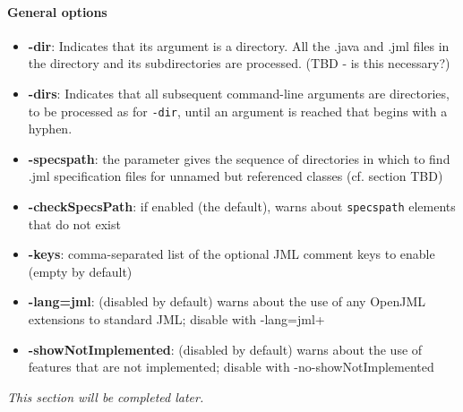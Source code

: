 \paragraph{General options}
\begin{itemize}[noitemsep,nolistsep]
\item \textbf{-dir}: Indicates that its argument is a directory. All the .java and .jml files in the directory and its subdirectories are processed. (TBD - is this necessary?)
\item \textbf{-dirs}: Indicates that all subsequent command-line arguments are directories, to be processed as for \texttt{-dir}, until an argument is reached that begins with a hyphen. 
\item \textbf{-specspath}: the parameter gives the sequence of directories in which to find .jml specification files for unnamed but referenced classes (cf. section TBD)
\item \textbf{-checkSpecsPath}: if enabled (the default), warns about \texttt{specspath} elements that do not exist
\item \textbf{-keys}: comma-separated list of the optional JML comment keys to enable (empty by default)
\item \textbf{-lang=jml}: (disabled by default) warns about the use of any OpenJML extensions to standard JML; disable with -lang=jml+
\item \textbf{-showNotImplemented}: (disabled by default) warns about the use of features that are not implemented; disable with -no-showNotImplemented
\end{itemize}


\textit{This section will be completed later.} %


